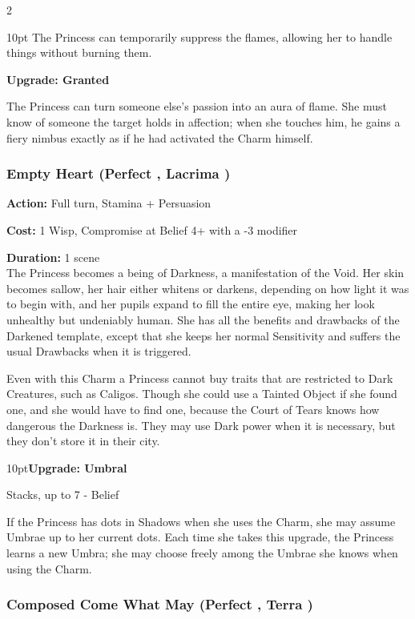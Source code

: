 \begin{multicols}{2}
\begin{myindentpar}{10pt}
The Princess can temporarily suppress the flames, allowing her to handle things without burning them. 

\textbf{Upgrade: Granted}

The Princess can turn someone else's passion into an aura of flame. She must know of someone the target holds in affection; when she touches him, he gains a fiery nimbus exactly as if he had activated the Charm himself.\end{myindentpar}

\subsubsection*{Empty Heart (Perfect \textbullet\textbullet, Lacrima \textbullet\textbullet\textbullet\textbullet)}

\noindent \textbf{Action:} Full turn, Stamina + Persuasion

\noindent \textbf{Cost:} 1 Wisp, Compromise at Belief 4+ with a -3 modifier

\noindent \textbf{Duration:} 1 scene \\

\noindent The Princess becomes a being of Darkness, a manifestation of the Void. Her skin becomes sallow, her hair either whitens or darkens, depending on how light it was to begin with, and her pupils expand to fill the entire eye, making her look unhealthy but undeniably human. She has all the benefits and drawbacks of the Darkened template, except that she keeps her normal Sensitivity and suffers the usual Drawbacks when it is triggered.

Even with this Charm a Princess cannot buy traits that are restricted to Dark Creatures, such as Caligos. Though she could use a Tainted Object if she found one, and she would have to find one, because the Court of Tears knows how dangerous the Darkness is. They may use Dark power when it is necessary, but they don't store it in their city. 

\begin{myindentpar}{10pt}\textbf{Upgrade: Umbral}

Stacks, up to 7 - Belief

If the Princess has dots in Shadows when she uses the Charm, she may assume Umbrae up to her current dots. Each time she takes this upgrade, the Princess learns a new Umbra; she may choose freely among the Umbrae she knows when using the Charm. \end{myindentpar}

\subsubsection*{Composed Come What May (Perfect \textbullet\textbullet, Terra \textbullet\textbullet)}


\end{multicols}
